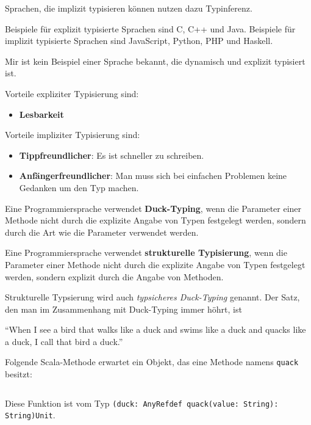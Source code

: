 Sprachen, die implizit typisieren können nutzen dazu Typinferenz.

Beispiele für explizit typisierte Sprachen sind C, C++ und Java.
Beispiele für implizit typisierte Sprachen sind JavaScript, Python, PHP und Haskell.

Mir ist kein Beispiel einer Sprache bekannt, die dynamisch und explizit typisiert
ist.

Vorteile expliziter Typisierung sind:

\begin{itemize}
    \item \textbf{Lesbarkeit}
\end{itemize}

Vorteile impliziter Typisierung sind:

\begin{itemize}
    \item \textbf{Tippfreundlicher}: Es ist schneller zu schreiben.
    \item \textbf{Anfängerfreundlicher}: Man muss sich bei einfachen Problemen
          keine Gedanken um den Typ machen.
\end{itemize}

\begin{definition}%
    \begin{defenum}
        \item Eine Programmiersprache verwendet \textbf{Duck-Typing}, wenn die Parameter einer 
              Methode nicht durch die explizite Angabe von Typen festgelegt werden, sondern
              durch die Art wie die Parameter verwendet werden.
        \item Eine Programmiersprache verwendet \textbf{strukturelle Typisierung}, wenn die
              Parameter einer Methode nicht durch die explizite Angabe von Typen
              festgelegt werden, sondern explizit durch die Angabe von Methoden.
    \end{defenum}
\end{definition}

Strukturelle Typsierung wird auch \textit{typsicheres Duck-Typing} genannt. 
Der Satz, den man im Zusammenhang mit Duck-Typing immer höhrt, ist

\enquote{When I see a bird that walks like a duck and swims like a duck and quacks like a duck, I call that bird a duck.}

\begin{beispiel}
    Folgende Scala-Methode erwartet ein Objekt, das eine Methode namens \texttt{quack}
    besitzt:

    \inputminted[numbersep=5pt, tabsize=4]{scala}{scripts/scala/duck-typing-example.scala}

    Diese Funktion ist vom Typ \texttt{(duck: AnyRef{def quack(value: String): String})Unit}.
\end{beispiel}

